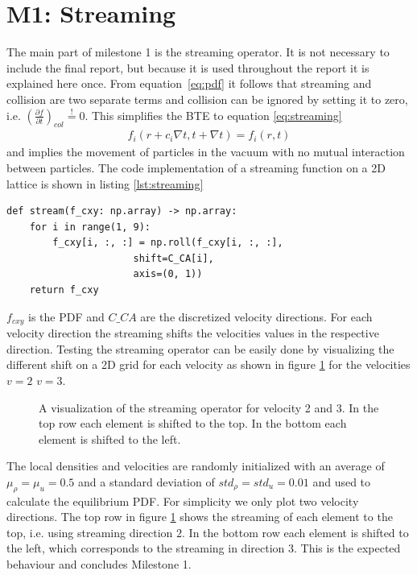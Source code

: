 \documentclass[a4paper,11pt, oneside]{book}
\begin{document}
\section{M1: Streaming}
The main part of milestone 1 is the streaming operator. It is not necessary to include the final report, but because it is used throughout the report it is explained here once. 
From equation~\ref{eq:pdf} it follows that streaming and collision are two separate terms and collision can be ignored by setting it to zero, i.e. $\left( \frac{\partial f}{\partial t} \right)_{col} \overset{!}{=} 0$.
This simplifies the BTE to equation \ref{eq:streaming} 
\begin{equation}
  \label{eq:streaming}
  \begin{aligned}
    f_{i}(r+c_{i} \nabla t,t+\nabla t)=f_{i}(r,t)
  \end{aligned}
\end{equation}
and implies the movement of particles in the vacuum with no mutual interaction between particles.
The code implementation of a streaming function on a 2D lattice is shown in listing \ref{lst:streaming}
\begin{center}
\begin{lstlisting}[caption=Implementation of the streaming operator,label=lst:streaming, basicstyle=\small]
def stream(f_cxy: np.array) -> np.array:
    for i in range(1, 9):
        f_cxy[i, :, :] = np.roll(f_cxy[i, :, :], 
                      shift=C_CA[i], 
                      axis=(0, 1))
    return f_cxy
  \end{lstlisting}
\end{center}
$f_{cxy}$ is the PDF and $C \_ CA$ are the discretized velocity directions.
For each velocity direction the streaming shifts the velocities values in the respective direction.
Testing the streaming operator can be easily done by visualizing the different shift on a 2D grid for each velocity as shown in figure \ref{fig:m1-shifting} for the velocities $v=2$ $v=3$.
\begin{figure}[ht]
\centering
\resizebox{\columnwidth}{!}{\large}
\vspace*{-10mm}
\caption[Visualization of the streaming]{A visualization of the streaming operator for velocity 2 and 3. In the top row each element is shifted to the top. In the bottom  each element is shifted to the left.}
\label{fig:m1-shifting}
\end{figure}
The local densities and velocities are randomly initialized with an average of $\mu_{\rho}=\mu_{u}=0.5$ and a standard deviation of $std_{\rho}=std_{u}=0.01$ and used to calculate the equilibrium PDF.
For simplicity we only plot two velocity directions.
The top row in figure \ref{fig:m1-shifting} shows the streaming of each element to the top, i.e. using streaming direction $2$. In the bottom row each element is shifted to the left, which corresponds to the streaming in direction $3$.
This is the expected behaviour and concludes Milestone 1.
\end{document}
